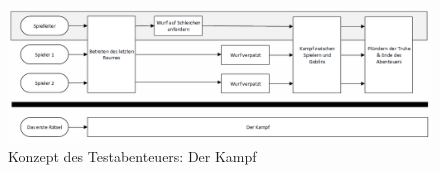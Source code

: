\begin{figure}[h]
	\centering
		\includegraphics[width=1.00\textwidth]{media/storyflow_03.png}
	\caption{Konzept des Testabenteuers: Der Kampf}
	\label{fig:storyflow_03}
\end{figure}



\clearpage




